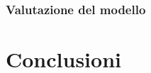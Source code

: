 \documentclass{article}
\begin{document}

\subsubsection{Valutazione del modello}



\section{Conclusioni}
\end{document}
